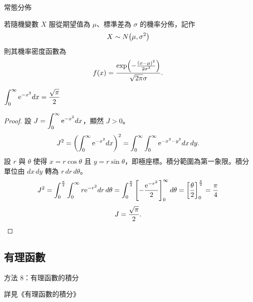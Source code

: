 \documentclass{beamer}
\newcommand{\Left} {\mathopen{}\mathclose\bgroup\left}
\newcommand{\Right}{\aftergroup\egroup\right}
\newcommand{\e}{\textup e}
\newcommand{\erf} {\operatorname{erf}}
\newcommand{\negskip}{\vskip -2em plus 3pt minus 3pt}
\theoremstyle{remark}
\begin{document}
\begin{CJK}{UTF8}{bsmi}
\begin{frame}{常態分佈}
  \begin{definition}
    若隨機變數 $X$ 服從期望值為 $\mu$、標準差為 $\sigma$ 的機率分佈，記作
    \[X \sim N \Left( \mu, \sigma^2 \Right)\]
    則其機率密度函數為
    \[f(x) = \frac{\exp \Left( -\frac{\left( x - \mu \right)^2}{2\sigma^2} \Right)}{\sqrt{2\pi} \sigma}.\]
  \end{definition}
\end{frame}


\begin{frame}{$\displaystyle \int_0^\infty \e^{-x^2} dx = \frac{\sqrt\pi}{2}$}
  \begin{proof}
    設 $\displaystyle J = \int_0^\infty \e^{-x^2} dx$，顯然 $J > 0$。
    \[J^2 = \left( \int_0^\infty \e^{-x^2} dx \right)^2 = \int_0^\infty \int_0^\infty \e^{-x^2-y^2} dx\,dy.\]
    設 $r$ 與 $\theta$ 使得 $x = r\cos\theta$ 且 $y = r\sin\theta$，即極座標。積分範圍為第一象限。積分單位由 $dx\,dy$ 轉為
    $r\,dr\,d\theta$。
    \[J^2 = \int_0^{\frac\pi2} \int_0^\infty r \e^{-r^2} dr\,d\theta
	= \int_0^{\frac\pi2} \left[ -\frac{\e^{-r^2}}{2} \right]_0^\infty d\theta
	= \left[ \frac\theta2 \right]_0^{\frac\pi2}
	= \frac\pi4\]
    \[J = \frac{\sqrt\pi}{2}.\qedhere\]
  \end{proof}
\end{frame}

\subsection{有理函數}
\begin{frame}{方法 8：有理函數的積分}
  \centerline{詳見《有理函數的積分》}
\end{frame}


\end{CJK}
\end{document}
